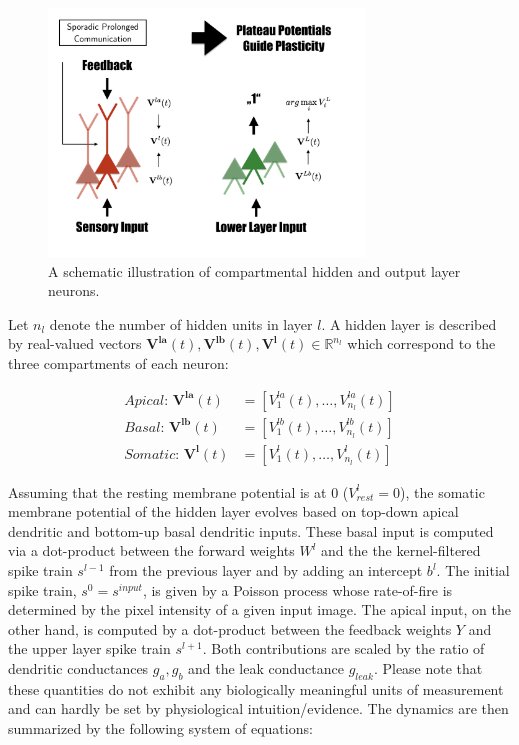 \documentclass[colorinlistoftodos]{article}
\theoremstyle{definition}
\begin{document}
\begin{figure}[H]
\centering
\includegraphics[width=0.75\textwidth]{../figures/report/elec_seg_3}
\caption{\label{fig:pyramidal} A schematic illustration of compartmental hidden and output layer neurons.}
\end{figure}
 
Let $n_{l}$ denote the number of hidden units in layer $l$. A hidden layer is described by real-valued vectors $\mathbf{V^{la}}(t), \mathbf{V^{lb}}(t), \mathbf{V^{l}}(t) \in \mathbb{R}^{n_l}$ which correspond to the three compartments of each neuron:

\begin{align*}
	\textit{Apical:  } \mathbf{V^{la}}(t) &= [V_1^{la}(t), \dots, V_{n_l}^{la}(t)]\\
	\textit{Basal:  } \mathbf{V^{lb}}(t) &= [V_1^{lb}(t), \dots, V_{n_l}^{lb}(t)]\\
	\textit{Somatic:  }\mathbf{V^{l}}(t) &= [V_1^{l}(t), \dots, V_{n_l}^{l}(t)]
\end{align*}

Assuming that the resting membrane potential is at 0 ($V^l_{rest}=0$), the somatic membrane potential of the hidden layer evolves based on top-down apical dendritic and bottom-up basal dendritic inputs. 
These basal input is computed via a dot-product between the forward weights $W^l$ and the the kernel-filtered spike train $s^{l-1}$ from the previous layer and by adding an intercept $b^l$. The initial spike train, $s^0 = s^{input}$, is given by a Poisson process whose rate-of-fire is determined by the pixel intensity of a given input image. 
The apical input, on the other hand, is computed by a dot-product between the feedback weights $Y$ and the upper layer spike train $s^{l+1}$. Both contributions are scaled by the ratio of dendritic conductances $g_a, g_b$ and the leak conductance $g_{leak}$. Please note that these quantities do not exhibit any biologically meaningful units of measurement and can hardly be set by physiological intuition/evidence.
The dynamics are then summarized by the following system of equations:
\end{document}
